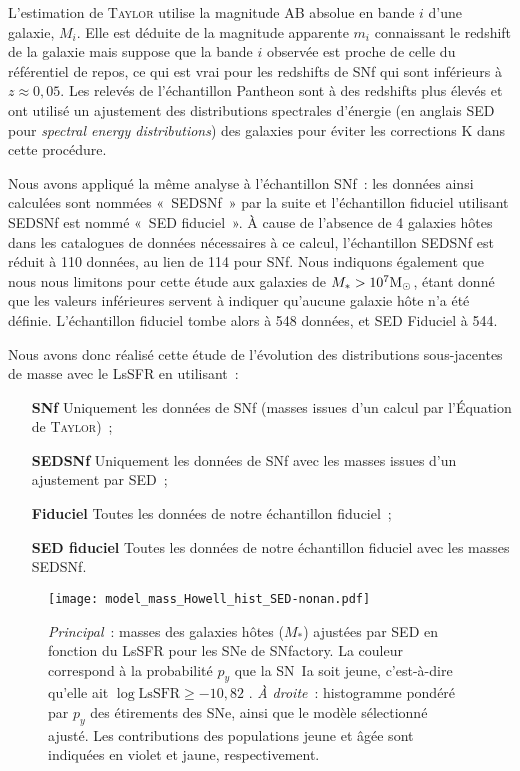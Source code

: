 \documentclass[../main/main.tex]{subfiles}
\begin{document}
L'estimation de \textsc{Taylor} utilise la magnitude AB absolue en bande $i$
d'une galaxie, $M_i$. Elle est déduite de la magnitude apparente $m_i$
connaissant le redshift de la galaxie mais suppose que la bande $i$ observée est
proche de celle du référentiel de repos, ce qui est vrai pour les redshifts de
SNf qui sont inférieurs à $z\approx 0,05$. Les relevés de l'échantillon Pantheon
sont à des redshifts plus élevés et ont utilisé un ajustement des distributions
spectrales d'énergie (en anglais SED pour \textit{spectral energy
distributions}) des galaxies pour éviter les corrections K dans cette procédure.

Nous avons appliqué la même analyse à l'échantillon SNf~: les données ainsi
calculées sont nommées «~SEDSNf~» par la suite et l'échantillon fiduciel
utilisant SEDSNf est nommé «~SED fiduciel~». À cause de l'absence de 4 galaxies
hôtes dans les catalogues de données nécessaires à ce calcul, l'échantillon
SEDSNf est réduit à 110 données, au lien de 114 pour SNf. Nous indiquons
également que nous nous limitons pour cette étude aux galaxies de $M_* >
10^7\si{\Msun}$, étant donné que les valeurs inférieures servent à indiquer
qu'aucune galaxie hôte n'a été définie. L'échantillon fiduciel tombe alors à
548 données, et SED Fiduciel à 544.

Nous avons donc réalisé cette étude de l'évolution des distributions
sous-jacentes de masse avec le LsSFR en utilisant~:
\begin{enumerate}
    \item [\bfseries SNf] Uniquement les données de SNf (masses issues d'un
        calcul par l'Équation de \textsc{Taylor})~;
    \item [\bfseries SEDSNf] Uniquement les données de SNf avec les masses
        issues d'un ajustement par SED~;
    \item [\bfseries Fiduciel] Toutes les données de notre échantillon
        fiduciel~;
    \item [\bfseries SED fiduciel] Toutes les données de notre échantillon
        fiduciel avec les masses SEDSNf.
\end{enumerate}

\begin{figure}[t]
    \centering
    \texttt{[image: model\_mass\_Howell\_hist\_SED-nonan.pdf]}
    \caption[$M_*$ en fonction du LsSFR des SNe~Ia de SNfactory et modèle de
    masse sélectionné ajusté]{\textit{Principal}~: masses des galaxies hôtes
        ($M_*$) ajustées par SED en fonction du LsSFR pour les SNe de SNfactory.
        La couleur correspond à la probabilité $p_y$ que la SN~Ia soit jeune,
        c'est-à-dire qu'elle ait $\log \mathrm{LsSFR} \geq -10,82$
        \citep[voir][et Chapitre~\ref{ch:stretch}]{rigault2020}. \textit{À
        droite}~: histogramme pondéré par $p_y$ des étirements des SNe, ainsi
        que le modèle sélectionné ajusté. Les contributions des populations
    jeune et âgée sont indiquées en violet et jaune, respectivement.}
    \label{fig:massmodel}
\end{figure}
\end{document}
